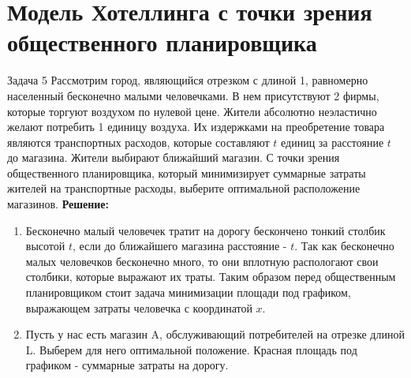 \section{Модель Хотеллинга с точки зрения общественного планировщика}
\begin{mybox}{Задача 5}
    \indent\setlength{\parindent}{1em}\indent\setlength{\parindent}{1em}Рассмотрим город, являющийся отрезком с длиной 1, равномерно населенный бесконечно малыми человечками. В нем
    присутствуют 2 фирмы, которые торгуют воздухом по нулевой цене. Жители
    абсолютно неэластично
    желают потребить 1 единицу воздуха. Их издержками на преобретение товара являются транспортных расходов, которые
    составляют $t$ единиц за расстояние $t$ до магазина. Жители выбирают ближайший магазин. С точки зрения
    общественного планировщика, который минимизирует суммарные затраты жителей на транспортные расходы, выберите
    оптимальной расположение магазинов.
    \tcblower
    \indent\setlength{\parindent}{1em}\indent\setlength{\parindent}{1em}\textbf{Решение:}
    \begin{enumerate}
        \item Бесконечно малый человечек тратит на дорогу бескончено тонкий столбик высотой $t$, если до ближайшего
        магазина расстояние - $t$. Так как бесконечно малых человечков бесконечно много, то они вплотную распологают
        свои столбики, которые выражают их траты. Таким образом перед общественным планировщиком стоит задача
        минимизации площади под графиком, выражающем затраты человечка с координатой $x$.
        \item Пусть у нас есть магазин A, обслуживающий потребителей на отрезке длиной L. Выберем для него оптимальной
        положение. Красная площадь под графиком - суммарные затраты на дорогу.
        \begin{center}
\end{center}
\end{enumerate}
\end{mybox}
